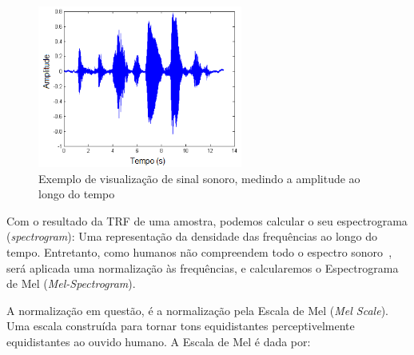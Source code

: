 \begin{figure}[]
\centering
\includegraphics[width=0.6\textwidth]{img/exsinalsom.PNG}
\caption{\label{fig:exsinalsom}Exemplo de visualização de sinal sonoro, medindo a amplitude ao longo do tempo}
\author{Fonte: UNESP, Princípios de Comunicações, 2013}
\end{figure}


Com o resultado da \acrshort{TRF} de uma amostra, podemos calcular o seu espectrograma (\textit{spectrogram}): Uma representação da densidade das frequências ao longo do tempo. Entretanto, como humanos não compreendem todo o espectro sonoro~\cite{62}, será aplicada uma normalização às frequências, e calcularemos o Espectrograma de Mel (\textit{Mel-Spectrogram}).




A normalização em questão, é a normalização pela Escala de Mel (\textit{Mel Scale}). Uma escala construída para tornar tons equidistantes perceptivelmente equidistantes ao ouvido humano. A Escala de Mel é dada por:

